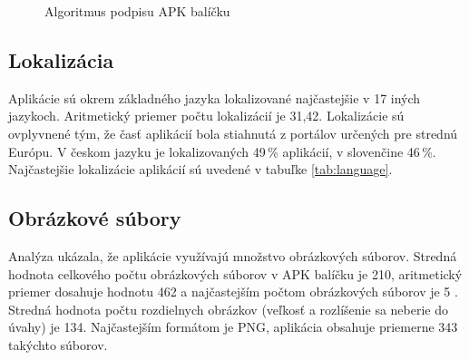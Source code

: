 \begin{figure}[!htbp]
\centering
{}
\label{fig:signAlg}
\caption{Algoritmus podpisu APK balíčku}
\end{figure}

\subsection*{Lokalizácia}
Aplikácie sú okrem základného jazyka lokalizované najčastejšie v 17 iných jazykoch. Aritmetický priemer počtu lokalizácií je 31,42. Lokalizácie sú ovplyvnené tým, že časť aplikácií bola stiahnutá z portálov určených pre strednú Európu. V českom jazyku je lokalizovaných 49\,\% aplikácií, v slovenčine 46\,\%. Najčastejšie lokalizácie aplikácií sú uvedené v tabuľke \ref{tab:language}.


\subsection*{Obrázkové súbory}
Analýza ukázala, že aplikácie využívajú množstvo obrázkových súborov. Stredná hodnota celkového počtu obrázkových súborov v APK balíčku je 210, aritmetický priemer dosahuje hodnotu 462 a najčastejším počtom obrázkových súborov je 5 . Stredná hodnota počtu rozdielnych obrázkov (veľkosť a rozlíšenie sa neberie do úvahy) je 134. Najčastejším formátom je PNG, aplikácia obsahuje priemerne 343 takýchto súborov.